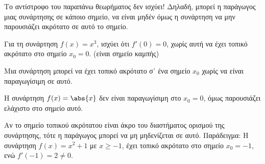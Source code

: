 \begin{rem}
\item {}
  \begin{myitemize}
    \item Το αντίστροφο του παραπάνω θεωρήματος δεν ισχύει! Δηλαδή, μπορεί η 
      παράγωγος μιας συνάρτησης σε κάποιο σημείο, να είναι μηδέν όμως η συνάρτηση να 
      μην παρουσιάζει ακρότατο σε αυτό το σημείο. 
      \begin{example}
        Για τη συνάρτηση $ f(x)=x^{3} $, ισχύει ότι $ f'(0)=0 $, χωρίς αυτή να έχει τοπικό 
        ακρότατο στο σημείο $ x_{0}=0 $. (είναι σημείο καμπής)

      \end{example}

    \item Μια συνάρτηση μπορεί να έχει τοπικό ακρότατο σ᾽ ένα σημείο $ x_{0} $ χωρίς 
      να είναι παραγωγίσιμη σε αυτό.  
      \begin{example}
        Η συνάρτηση $ f(x)= \abs{x} $ δεν είναι παραγωγίσιμη στο $ x_{0}=0 $, 
        όμως παρουσιάζει ελάχιστο στο σημείο αυτό.

      \end{example}

    \item Αν το σημείο τοπικού ακρότατου είναι άκρο του διαστήματος ορισμού της 
      συνάρτησης, τότε η παράγωγος μπορεί να μη μηδενίζεται σε αυτό. Παράδειγμα: Η 
      συνάρτηση $ f(x) = x^{2}+1 $ με $ x \geq -1 $, έχει τοπικό ακρότατο στο σημείο 
      $ x_{0}=-1 $, ενώ $ f'(-1)=2 \neq 0 $.
  \end{myitemize}
\end{rem}

